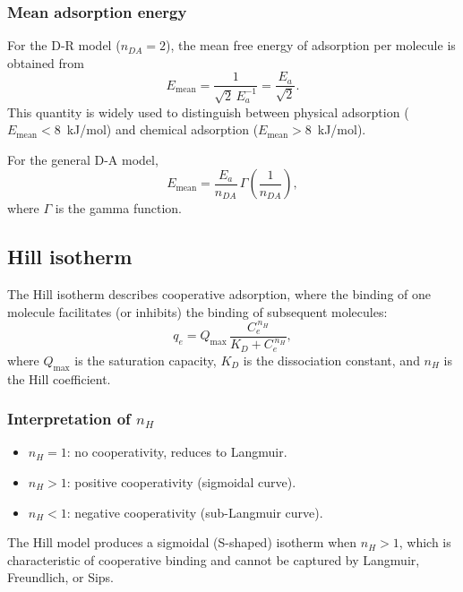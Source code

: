 \documentclass[12pt]{article}
\begin{document}
	\subsubsection{Mean adsorption energy}

	For the D-R model ($n_{DA} = 2$), the mean free energy of
	adsorption per molecule is obtained from
	\begin{equation}
		\boxed{E_{\mathrm{mean}} = \frac{1}{\sqrt{2}\,E_a^{-1}}
		= \frac{E_a}{\sqrt{2}}.}
	\end{equation}
	This quantity is widely used to distinguish between physical
	adsorption ($E_{\mathrm{mean}} < 8$~kJ/mol) and chemical
	adsorption ($E_{\mathrm{mean}} > 8$~kJ/mol).

	For the general D-A model,
	\begin{equation}
		E_{\mathrm{mean}} = \frac{E_a}{n_{DA}}\,
		\Gamma\!\left(\frac{1}{n_{DA}}\right),
	\end{equation}
	where $\Gamma$ is the gamma function.

	\subsection{Hill isotherm}

	The Hill isotherm describes cooperative adsorption, where the
	binding of one molecule facilitates (or inhibits) the binding of
	subsequent molecules:
	\begin{equation}
		q_e = Q_{\max}\,\frac{C_e^{\,n_H}}{K_D + C_e^{\,n_H}},
		\label{eq:Hill}
	\end{equation}
	where $Q_{\max}$ is the saturation capacity, $K_D$ is the
	dissociation constant, and $n_H$ is the Hill coefficient.

	\subsubsection{Interpretation of $n_H$}

	\begin{itemize}
		\item $n_H = 1$: no cooperativity, reduces to Langmuir.
		\item $n_H > 1$: positive cooperativity (sigmoidal curve).
		\item $n_H < 1$: negative cooperativity (sub-Langmuir curve).
	\end{itemize}
	The Hill model produces a sigmoidal (S-shaped) isotherm when
	$n_H > 1$, which is characteristic of cooperative binding and
	cannot be captured by Langmuir, Freundlich, or Sips.
\end{document}

